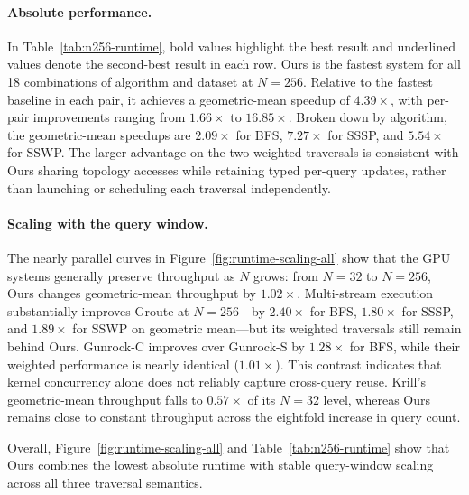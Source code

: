 \paragraph{Absolute performance.}
In Table~\ref{tab:n256-runtime}, bold values highlight the best result and
underlined values denote the second-best result in each row.
Ours is the fastest system for all 18 combinations of algorithm and dataset at
$N=256$.
Relative to the fastest baseline in each pair, it achieves a geometric-mean
speedup of $4.39\times$, with per-pair improvements ranging from
$1.66\times$ to $16.85\times$. Broken down by algorithm, the geometric-mean
speedups are $2.09\times$ for BFS, $7.27\times$ for SSSP, and $5.54\times$
for SSWP. The larger advantage on the two weighted traversals is consistent
with Ours sharing topology accesses while retaining typed per-query updates,
rather than launching or scheduling each traversal independently.

\paragraph{Scaling with the query window.}
The nearly parallel curves in Figure~\ref{fig:runtime-scaling-all} show that
the GPU systems generally preserve throughput as $N$ grows: from $N=32$ to
$N=256$, Ours changes geometric-mean throughput by $1.02\times$. Multi-stream
execution substantially improves Groute at $N=256$---by $2.40\times$ for BFS,
$1.80\times$ for SSSP, and $1.89\times$ for SSWP on geometric mean---but its
weighted traversals still remain behind Ours. Gunrock-C improves over
Gunrock-S by $1.28\times$ for BFS, while their weighted performance is nearly
identical ($1.01\times$). This contrast indicates that kernel concurrency alone
does not reliably capture cross-query reuse. Krill's geometric-mean throughput
falls to $0.57\times$ of its $N=32$ level, whereas Ours remains close to
constant throughput across the eightfold increase in query count.

Overall, Figure~\ref{fig:runtime-scaling-all} and
Table~\ref{tab:n256-runtime} show that Ours combines the lowest absolute
runtime with stable query-window scaling across all three traversal semantics.

%



